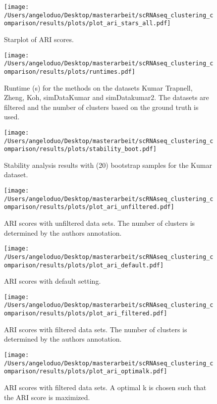 \documentclass[12pt, a4paper]{article}\usepackage[]{graphicx}\usepackage[]{color}
\begin{document}
\begin{figure}[!h]
\texttt{[image: /Users/angeloduo/Desktop/masterarbeit/scRNAseq\_clustering\_comparison/results/plots/plot\_ari\_stars\_all.pdf]}
\caption{Starplot of ARI scores.  }
\label{fig:arirank}
\end{figure}


\begin{figure}[!h]
\texttt{[image: /Users/angeloduo/Desktop/masterarbeit/scRNAseq\_clustering\_comparison/results/plots/runtimes.pdf]}
\caption{Runtime (s) for the methods on the datasets Kumar Trapnell, Zheng, Koh, simDataKumar and simDatakumar2. The datasets are filtered and the number of clusters based on the ground truth is used.}
\label{fig:runtime}
\end{figure}



\begin{figure}[!h]
\texttt{[image: /Users/angeloduo/Desktop/masterarbeit/scRNAseq\_clustering\_comparison/results/plots/stability\_boot.pdf]}
\caption{Stability analysis results with (20) bootstrap samples for the Kumar dataset.}
\label{fig:boot}
\end{figure}


\begin{figure}[!h]
\texttt{[image: /Users/angeloduo/Desktop/masterarbeit/scRNAseq\_clustering\_comparison/results/plots/plot\_ari\_unfiltered.pdf]}
\caption{ARI scores with unfiltered data sets. The number of clusters is determined by the authors annotation. }
\label{fig:ariunfilt}
\end{figure}

\begin{figure}[!h]
\texttt{[image: /Users/angeloduo/Desktop/masterarbeit/scRNAseq\_clustering\_comparison/results/plots/plot\_ari\_default.pdf]}
\caption{ARI scores with default setting. }
\label{fig:aridef}
\end{figure}

\begin{figure}[!h]
\texttt{[image: /Users/angeloduo/Desktop/masterarbeit/scRNAseq\_clustering\_comparison/results/plots/plot\_ari\_filtered.pdf]}
\caption{ARI scores with filtered data sets.  The number of clusters is determined by the authors annotation. }
\label{fig:arifilt}
\end{figure}

\begin{figure}[!h]
\texttt{[image: /Users/angeloduo/Desktop/masterarbeit/scRNAseq\_clustering\_comparison/results/plots/plot\_ari\_optimalk.pdf]}
\caption{ARI scores with filtered data sets. A optimal k is chosen such that the ARI score is maximized. }
\label{fig:ariopt}
\end{figure}
\end{document}
